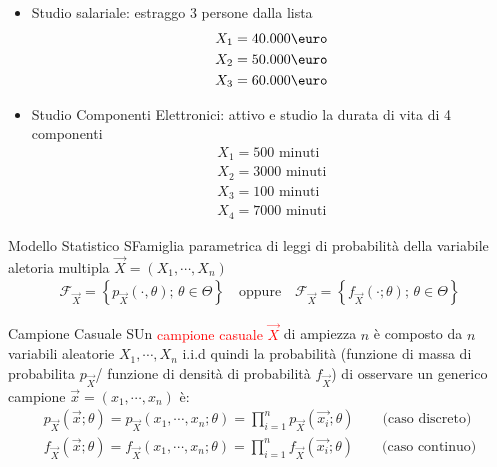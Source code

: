 \documentclass{article}  %
\theoremstyle{definition}
\begin{document}
\begin{esempio}
	\begin{itemize}
		\item Studio salariale: estraggo 3 persone dalla lista
		      \begin{align*}
			      X_1 = 40.000 \text{\euro} \\
			      X_2 = 50.000 \text{\euro} \\
			      X_3 = 60.000 \text{\euro}
		      \end{align*}
		\item Studio Componenti Elettronici: attivo e studio la durata di vita di 4 componenti
		      \begin{align*}
			      X_1 = 500 \text{ minuti}  \\
			      X_2 = 3000 \text{ minuti} \\
			      X_3 = 100 \text{ minuti}  \\
			      X_4 = 7000 \text{ minuti}
		      \end{align*}
	\end{itemize}
\end{esempio}
\begin{theorem}{Modello Statistico}
	SFamiglia parametrica di leggi di probabilità della variabile aletoria multipla $\vec{X} = \left(X_1, \cdots, X_n \right)$
	\begin{align*}
		\mathcal{F}_{\vec{X}} = \left\{ p_{\vec{X}}(\cdot, \theta); \, \theta \in \Theta \right\} \quad \text{oppure} \quad  \mathcal{F}_{\vec{X}} = \left\{ f_{\vec{X}}(\cdot; \theta); \, \theta \in \Theta \right\}
	\end{align*}
\end{theorem}
\begin{theorem}{Campione Casuale}
	SUn \textcolor{red}{campione casuale $\vec{X}$} di ampiezza $n$ è composto da $n$ variabili aleatorie $X_1, \cdots, X_n$ i.i.d quindi la probabilità (funzione di massa di probabilita $p_{\vec{X}}$/
	funzione di densità di probabilità $f_{\vec{X}}$) di osservare un generico campione $\vec{x}=(x_1, \cdots, x_n)$ è:
	\begin{align*}
		p_{\vec{X}}(\vec{x};\theta) = p_{\vec{X}}(x_1, \cdots, x_n;\theta) = \prod_{i=1}^{n}p_{\vec{X}}(\vec{x_i};\theta) \quad \quad \text{(caso discreto)} \\
		f_{\vec{X}}(\vec{x};\theta) = f_{\vec{X}}(x_1, \cdots, x_n;\theta) = \prod_{i=1}^{n}f_{\vec{X}}(\vec{x_i};\theta) \quad \quad \text{(caso continuo)}
	\end{align*}
\end{theorem}
\end{document}
